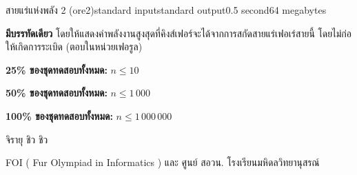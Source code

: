 \documentclass[11pt,a4paper]{article}
\begin{document}
\begin{problem}{สายแร่แห่งพลัง 2 (ore2)}{standard input}{standard output}{0.5 second}{64 megabytes}
\OutputFile

\textbf{มีบรรทัดเดียว} โดยให้แสดงค่าพลังงานสูงสุดที่คิงส์เฟอร์จะได้จากการสกัดสายแร่เฟอเร่สายนี้ โดยไม่ก่อให้เกิดการระเบิด (ตอบในหน่วยเฟอรูล)


\Examples

\begin{example}
%
%
%
\end{example}

\Scoring

\textbf{25\% ของชุดทดสอบทั้งหมด:} $n \leq 10$

\textbf{50\% ของชุดทดสอบทั้งหมด:} $n \leq 1\,000$

\textbf{100\% ของชุดทดสอบทั้งหมด:} $n \leq 1\,000\,000$

\Source

จิรายุ ชิว ชิว

FOI ( Fur Olympiad in Informatics ) และ ศูนย์ สอวน. โรงเรียนมหิดลวิทยานุสรณ์

\end{problem}
\end{document}
